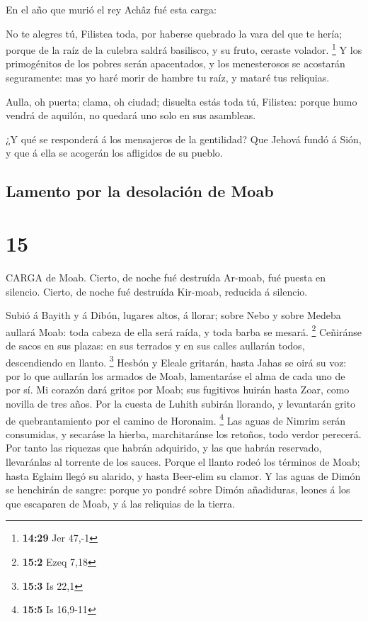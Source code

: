 En el año que murió el rey Achâz fué esta carga:

 No te alegres tú, Filistea toda, por haberse quebrado la
vara del que te hería; porque de la raíz de la culebra saldrá basilisco,
y su fruto, ceraste volador. \footnote{\textbf{14:29} Jer 47,-1}
 Y los primogénitos de los pobres serán apacentados, y los
menesterosos se acostarán seguramente: mas yo haré morir de hambre tu
raíz, y mataré tus reliquias.

 Aulla, oh puerta; clama, oh ciudad; disuelta estás toda
tú, Filistea: porque humo vendrá de aquilón, no quedará uno solo en sus
asambleas.

 ¿Y qué se responderá á los mensajeros de la gentilidad?
Que Jehová fundó á Sión, y que á ella se acogerán los afligidos de su
pueblo.

\hypertarget{lamento-por-la-desolaciuxf3n-de-moab}{%
\subsection{Lamento por la desolación de
Moab}\label{lamento-por-la-desolaciuxf3n-de-moab}}

\hypertarget{section-14}{%
\section{15}\label{section-14}}

 CARGA de Moab. Cierto, de noche fué destruída Ar-moab, fué
puesta en silencio. Cierto, de noche fué destruída Kir-moab, reducida á
silencio.

 Subió á Bayith y á Dibón, lugares altos, á llorar; sobre
Nebo y sobre Medeba aullará Moab: toda cabeza de ella será raída, y toda
barba se mesará. \footnote{\textbf{15:2} Ezeq 7,18} 
Ceñiránse de sacos en sus plazas: en sus terrados y en sus calles
aullarán todos, descendiendo en llanto. \footnote{\textbf{15:3} Is 22,1}
 Hesbón y Eleale gritarán, hasta Jahas se oirá su voz: por
lo que aullarán los armados de Moab, lamentaráse el alma de cada uno de
por sí.  Mi corazón dará gritos por Moab; sus fugitivos
huirán hasta Zoar, como novilla de tres años. Por la cuesta de Luhith
subirán llorando, y levantarán grito de quebrantamiento por el camino de
Horonaim. \footnote{\textbf{15:5} Is 16,9-11}  Las aguas de
Nimrim serán consumidas, y secaráse la hierba, marchitaránse los
retoños, todo verdor perecerá.  Por tanto las riquezas que
habrán adquirido, y las que habrán reservado, llevaránlas al torrente de
los sauces.  Porque el llanto rodeó los términos de Moab;
hasta Eglaim llegó su alarido, y hasta Beer-elim su clamor. 
Y las aguas de Dimón se henchirán de sangre: porque yo pondré sobre
Dimón añadiduras, leones á los que escaparen de Moab, y á las reliquias
de la tierra.

